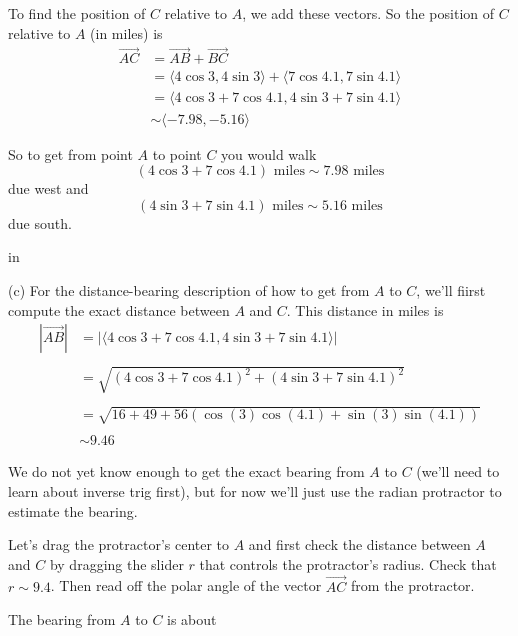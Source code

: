 \documentclass{ximera}
\newcommand{\pskip}{\vskip 0.1 in}
\begin{document}
\begin{example}
\begin{explanation}
To find the position of $C$ relative to $A$, we add these vectors. So the position of $C$ relative to $A$ (in miles) is 
\begin{align*}
\overrightarrow{AC} &= \overrightarrow{AB} + \overrightarrow{BC} \\
                              &= \langle 4 \cos 3, 4 \sin 3\rangle + \langle 7 \cos 4.1, 7 \sin 4.1\rangle \\
                              & =    \langle 4 \cos 3 + 7 \cos 4.1 , 4 \sin 3 + 7 \sin  4.1\rangle   \\
                              & \sim \langle  -7.98 ,  -5.16  \rangle 
\end{align*}

So to get from point $A$ to point $C$ you would walk
\[
     (4 \cos 3 + 7 \cos 4.1) \text{  miles} \sim 7.98 \text{ miles} 
\]
due west and 
\[
   (4 \sin 3 + 7 \sin 4.1) \text{  miles} \sim 5.16 \text{ miles} 
\]
due south.

\pskip

(c) For the distance-bearing description of how to get from $A$ to $C$, we'll fiirst compute the exact distance between $A$ and $C$. This distance in miles is
\begin{align*}
   | \overrightarrow{AB}| &= |   \langle 4 \cos 3 + 7 \cos 4.1 , 4 \sin 3 + 7 \sin  4.1\rangle   |   \\ \\
                                   & = \sqrt{( 4 \cos 3 + 7 \cos 4.1)^2 + (4 \sin 3 + 7 \sin  4.1)^2}  \\ \\
                                  & =  \sqrt{16 + 49 + 56 (\cos(3) \cos(4.1) + \sin(3)\sin(4.1))}  \\ \\
                                  & \sim 9.46
\end{align*}

We do not yet know enough to get the exact bearing from $A$ to $C$ (we'll need to learn about inverse trig first), but for now we'll just use the radian protractor to estimate the bearing. 

Let's drag the protractor's center to $A$ and first check the distance between $A$ and $C$ by dragging the slider $r$ that controls the protractor's radius. Check that $r\sim 9.4$. Then read off the polar angle of the vector $\overrightarrow{AC}$ from the protractor. 

\begin{question}  \label{Q43656ff:Motion}
The bearing from $A$ to $C$ is about 
\begin{multipleChoice}  
\end{multipleChoice} 


\end{question}
\end{explanation}
\end{example}
\end{document}
